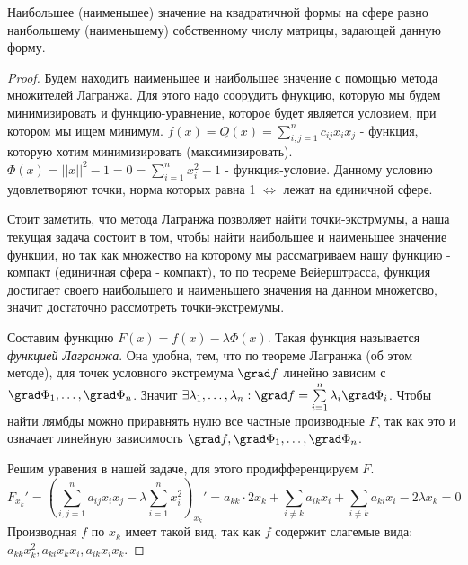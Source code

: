
\begin{theorem} \thmslashn

Наибольшее (наименьшее) значение на квадратичной формы на сфере равно наибольшему (наименьшему) собственному числу матрицы, задающей данную форму.
  \begin{proof} \thmslashn
  
    Будем находить наименьшее и наибольшее значение с помощью метода множителей Лагранжа. Для этого надо соорудить фнукцию, которую мы будем минимизировать и функцию-уравнение, которое будет является условием, при котором мы ищем минимум. $f(x) = Q(x) = \sum\limits_{i, j = 1}^{n}{c_{ij}x_ix_j}$ - функция, которую хотим минимизировать (максимизировать).
    $\Phi(x) = ||x||^2 - 1 = 0 = \sum\limits_{i = 1}^{n}{x_i^2} - 1$ - функция-условие. Данному условию удовлетворяют точки, норма которых равна 1 $\Leftrightarrow$ лежат на единичной сфере.
    \par Стоит заметить, что метода Лагранжа позволяет найти точки-экстрмумы, а наша текущая задача состоит в том, чтобы найти наибольшее и наименьшее значение функции, но так как множество на которому мы рассматриваем нашу функцию - компакт (единичная сфера - компакт), то по теореме Вейерштрасса, функция достигает своего наибольшего и наименьшего значения на данном множетсво, значит достаточно рассмотреть точки-экстремумы.
    \par Составим функцию $F(x) = f(x) - \lambda\Phi(x)$. Такая функция называется \textit{функцией Лагранжа}. Она удобна, тем, что по теореме Лагранжа (об этом методе), для точек условного экстремума $\grad f$ линейно зависим с $\grad\Phi_1, \dots, \grad\Phi_n$. Значит $\exists \lambda_1, \dots, \lambda_n : \grad f = \sum\limits_{i = 1}^{n}\lambda_i\grad\Phi_i$. Чтобы найти лямбды можно приравнять нулю все частные производные $F$, так как это и означает линейную зависимость $\grad f, \grad \Phi_1, \dots, \grad \Phi_n$.
    \par Решим уравения в нашей задаче, для этого продифференцируем $F$. 
    \[ F_{x_k}' = \left(\sum\limits_{i, j = 1}^{n}{a_{ij}x_ix_j} - \lambda\sum\limits_{i = 1}^{n}{x_i^2}\right)_{x_k}' = a_{kk}\cdot 2x_k + \sum\limits_{i\neq k}{a_{ik}x_{i}} + \sum\limits_{i\neq k}{a_{ki}x_{i}} - 2\lambda x_k = 0 \]
    Производная $f$ по $x_k$ имеет такой вид, так как $f$ содержит слагемые вида: $a_{kk}x_k^2, a_{ki}{x_kx_i}, a_{ik}x_ix_k$. \par

\end{proof}
\end{theorem}
